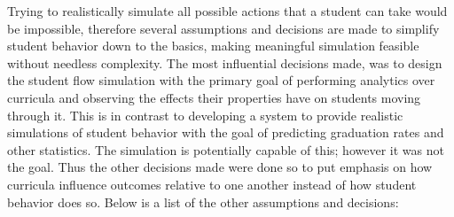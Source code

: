 \documentclass[botnum, fleqn]{unmeethesis}
\begin{document}
Trying to realistically simulate all possible actions that a student can take would be impossible, therefore several assumptions and decisions are made to simplify student behavior down to the basics, making meaningful simulation feasible without needless complexity. The most influential decisions made, was to design the student flow simulation with the primary goal of performing analytics over curricula and observing the effects their properties have on students moving through it. This is in contrast to developing a system to provide realistic simulations of student behavior with the goal of predicting graduation rates and other statistics. The simulation is potentially capable of this; however it was not the goal. Thus the other decisions made were done so to put emphasis on how curricula influence outcomes relative to one another instead of how student behavior does so. Below is a list of the other assumptions and decisions:
\end{document}

